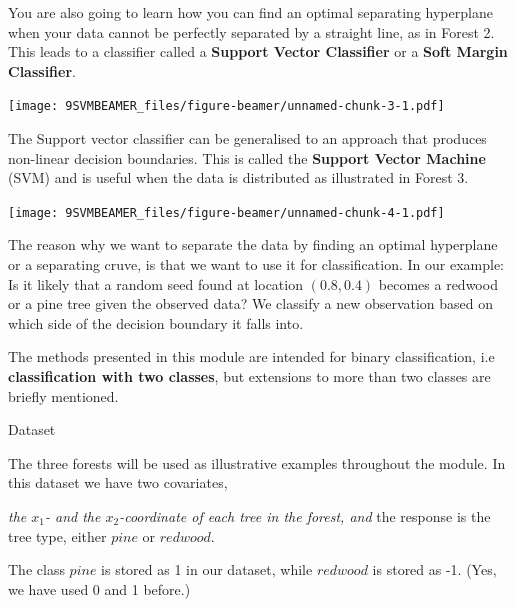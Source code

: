\documentclass[ignorenonframetext,]{beamer}
\begin{document}
\begin{frame}

You are also going to learn how you can find an optimal separating
hyperplane when your data cannot be perfectly separated by a straight
line, as in Forest 2. This leads to a classifier called a
\textbf{Support Vector Classifier} or a \textbf{Soft Margin Classifier}.

\texttt{[image: 9SVMBEAMER\_files/figure-beamer/unnamed-chunk-3-1.pdf]}

\end{frame}

\begin{frame}

The Support vector classifier can be generalised to an approach that
produces non-linear decision boundaries. This is called the
\textbf{Support Vector Machine} (SVM) and is useful when the data is
distributed as illustrated in Forest 3.

\texttt{[image: 9SVMBEAMER\_files/figure-beamer/unnamed-chunk-4-1.pdf]}

\end{frame}

\begin{frame}

The reason why we want to separate the data by finding an optimal
hyperplane or a separating cruve, is that we want to use it for
classification. In our example: Is it likely that a random seed found at
location \((0.8,0.4)\) becomes a redwood or a pine tree given the
observed data? We classify a new observation based on which side of the
decision boundary it falls into.

The methods presented in this module are intended for binary
classification, i.e \textbf{classification with two classes}, but
extensions to more than two classes are briefly mentioned.

\end{frame}

\begin{frame}

\begin{block}{Dataset}

The three forests will be used as illustrative examples throughout the
module. In this dataset we have two covariates,

\emph{the \(x_1\)- and the \(x_2\)-coordinate of each tree in the
forest, and } the response is the tree type, either \(pine\) or
\(redwood\).

The class \(pine\) is stored as 1 in our dataset, while \(redwood\) is
stored as -1. (Yes, we have used 0 and 1 before.)

\end{block}

\end{frame}
\end{document}
